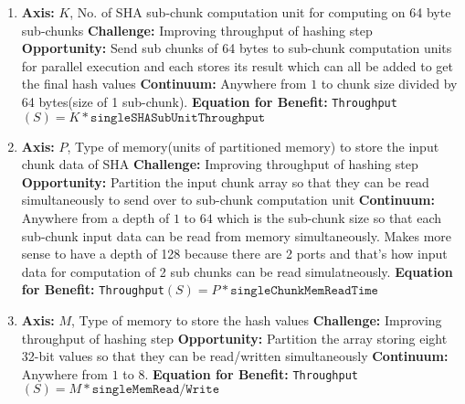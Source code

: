 \documentclass{article}
\begin{document}
\begin{enumerate}
\item%

\textbf{Axis:} $K$, No. of SHA sub-chunk computation unit for computing on 64 byte sub-chunks
\newline
\textbf{Challenge:} Improving throughput of hashing step
\newline
\textbf{Opportunity:} Send sub chunks of 64 bytes to sub-chunk computation units for parallel execution and each stores its result which can all be added to get the final hash values
\newline
\textbf{Continuum:} Anywhere from $1$ to chunk size divided by 64 bytes(size of 1 sub-chunk).  
\newline
\textbf{Equation for Benefit:} \texttt{Throughput}$\left(S\right)=K*\texttt{singleSHASubUnitThroughput}$

\item%

\textbf{Axis:} $P$, Type of memory(units of partitioned memory) to store the input chunk data of SHA
\newline
\textbf{Challenge:} Improving throughput of hashing step
\newline
\textbf{Opportunity:} Partition the input chunk array so that they can be read simultaneously to send over to sub-chunk computation unit
\newline
\textbf{Continuum:} Anywhere from a depth of $1$ to $64$ which is the sub-chunk size so that each sub-chunk input data can be read from memory simultaneously. Makes more sense to have a depth of 128 because there are 2 ports and that's how input data for computation of 2 sub chunks can be read simulatneously.    
\newline
\textbf{Equation for Benefit:} \texttt{Throughput}$\left(S\right)=P*\texttt{singleChunkMemReadTime}$

\item%

\textbf{Axis:} $M$, Type of memory to store the hash values  
\newline
\textbf{Challenge:} Improving throughput of hashing step
\newline
\textbf{Opportunity:} Partition the array storing eight 32-bit values so that they can be read/written simultaneously
\newline
\textbf{Continuum:} Anywhere from $1$ to $8$.  
\newline
\textbf{Equation for Benefit:} \texttt{Throughput}$\left(S\right)=M*\texttt{singleMemRead/Write}$


\end{enumerate}
\end{document}
